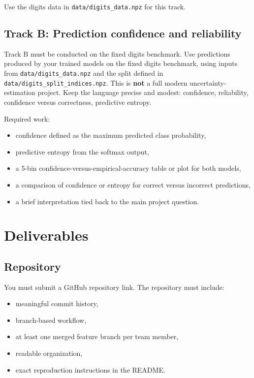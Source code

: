 \documentclass[11pt]{article}
\newcommand{\filepath}[1]{\nolinkurl{#1}}
\begin{document}
Use the digits data in \filepath{data/digits_data.npz} for this track.

\subsection{Track B: Prediction confidence and reliability}

Track B must be conducted on the fixed digits benchmark. Use predictions produced by your trained models on the fixed digits benchmark, using inputs from \filepath{data/digits_data.npz} and the split defined in \filepath{data/digits_split_indices.npz}. This is \textbf{not} a full modern uncertainty-estimation project. Keep the language precise and modest: confidence, reliability, confidence versus correctness, predictive entropy.

Required work:

\begin{itemize}
    \item confidence defined as the maximum predicted class probability,
    \item predictive entropy from the softmax output,
    \item a 5-bin confidence-versus-empirical-accuracy table or plot for both models,
    \item a comparison of confidence or entropy for correct versus incorrect predictions,
    \item a brief interpretation tied back to the main project question.
\end{itemize}

\section{Deliverables}

\subsection{Repository}

You must submit a GitHub repository link. The repository must include:

\begin{itemize}
    \item meaningful commit history,
    \item branch-based workflow,
    \item at least one merged feature branch per team member,
    \item readable organization,
    \item exact reproduction instructions in the README.
\end{itemize}
\end{document}
